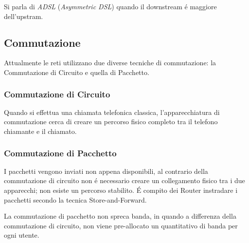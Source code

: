 \documentclass[12pt]{article}
\begin{document}
Si parla di \textit{ADSL} (\textit{Asymmetric DSL}) quando il downstream \'e maggiore dell'upstram.


\subsection{Commutazione}
Attualmente le reti utilizzano due diverse tecniche di commutazione: la Commutazione di Circuito e quella di 
Pacchetto.

\subsubsection{Commutazione di Circuito}
Quando si effettua una chiamata telefonica classica, l'apparecchiatura di commutazione cerca di creare un percorso
fisico completo tra il telefono chiamante e il chiamato.

\subsubsection{Commutazione di Pacchetto}
I pacchetti vengono inviati non appena disponibili, al contrario della commutazione di circuito non \'e necessario
creare un collegamento fisico tra i due apparecchi; non esiste un percorso stabilito. \'E compito dei Router 
instradare i pacchetti secondo la tecnica Store-and-Forward.

La commutazione di pacchetto non spreca banda, in quando a differenza della commutazione di circuito, non viene 
pre-allocato un quantitativo di banda per ogni utente.
\end{document}
